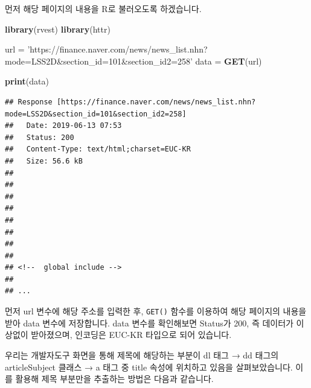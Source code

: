 \documentclass[]{book}
\newenvironment{Shaded}{\begin{snugshade}}{\end{snugshade}}
\newcommand{\DataTypeTok}[1]{\textcolor[rgb]{0.13,0.29,0.53}{#1}}
\newcommand{\KeywordTok}[1]{\textcolor[rgb]{0.13,0.29,0.53}{\textbf{#1}}}
\newcommand{\NormalTok}[1]{#1}
\newcommand{\OperatorTok}[1]{\textcolor[rgb]{0.81,0.36,0.00}{\textbf{#1}}}
\newcommand{\StringTok}[1]{\textcolor[rgb]{0.31,0.60,0.02}{#1}}
\begin{document}
먼저 해당 페이지의 내용을 R로 불러오도록 하겠습니다.

\begin{Shaded}
\begin{Highlighting}[]
\KeywordTok{library}\NormalTok{(rvest)}
\KeywordTok{library}\NormalTok{(httr)}

\NormalTok{url =}\StringTok{ 'https://finance.naver.com/news/news_list.nhn?mode=LSS2D&section_id=101&section_id2=258'}
\NormalTok{data =}\StringTok{ }\KeywordTok{GET}\NormalTok{(url)}

\KeywordTok{print}\NormalTok{(data)}
\end{Highlighting}
\end{Shaded}

\begin{verbatim}
## Response [https://finance.naver.com/news/news_list.nhn?mode=LSS2D&section_id=101&section_id2=258]
##   Date: 2019-06-13 07:53
##   Status: 200
##   Content-Type: text/html;charset=EUC-KR
##   Size: 56.6 kB
## 
## 
## 
## 
## 
## 
## 
## 
## <!--  global include -->
## 
## ...
\end{verbatim}

먼저 url 변수에 해당 주소를 입력한 후, \texttt{GET()} 함수를 이용하여 해당 페이지의 내용을 받아 data 변수에 저장합니다. data 변수를 확인해보면 Status가 200, 즉 데이터가 이상없이 받아졌으며, 인코딩은 EUC-KR 타입으로 되어 있습니다.

우리는 개발자도구 화면을 통해 제목에 해당하는 부분이 dl 태그 → dd 태그의 articleSubject 클래스 → a 태그 중 title 속성에 위치하고 있음을 살펴보았습니다. 이를 활용해 제목 부분만을 추출하는 방법은 다음과 같습니다.

\begin{Shaded}
\end{Shaded}
\end{document}
